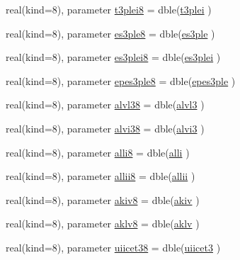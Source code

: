 \begin{DoxyCompactItemize}
\item 
real(kind=8), parameter \hyperlink{namespaceconsts__coms_a9a4f83fc2d002ec3752516d7626b28c7}{t3plei8} = dble(\hyperlink{namespaceconsts__coms_a091ec81cfeedd9148a6f44471936ab4f}{t3plei} )
\item 
real(kind=8), parameter \hyperlink{namespaceconsts__coms_a0296d1fa8ac9a5b8469ab8cc28dc0b1c}{es3ple8} = dble(\hyperlink{namespaceconsts__coms_acce85d2ba9f93e18b505d97bffd4a453}{es3ple} )
\item 
real(kind=8), parameter \hyperlink{namespaceconsts__coms_aca52530455d0c1b8063f2f30a3366291}{es3plei8} = dble(\hyperlink{namespaceconsts__coms_ae5b40232ff74fe2d9258b854fe070dc6}{es3plei} )
\item 
real(kind=8), parameter \hyperlink{namespaceconsts__coms_aab17990b5af5fd6746fc4465af9394ba}{epes3ple8} = dble(\hyperlink{namespaceconsts__coms_a12ac1017d17262aa7e40fa9a325273b9}{epes3ple} )
\item 
real(kind=8), parameter \hyperlink{namespaceconsts__coms_a975fb046d5ee7ab5b6b9cef9f840808d}{alvl38} = dble(\hyperlink{namespaceconsts__coms_a8458ca23e2c2f0ef6580474773afd4e8}{alvl3} )
\item 
real(kind=8), parameter \hyperlink{namespaceconsts__coms_a93d2577c7a09eea29f032257a759bef3}{alvi38} = dble(\hyperlink{namespaceconsts__coms_aa133e21cddffbe4c7673ae73771a15bb}{alvi3} )
\item 
real(kind=8), parameter \hyperlink{namespaceconsts__coms_acc1b8962e7dd43281926417aa95561f7}{alli8} = dble(\hyperlink{namespaceconsts__coms_aed7ce8242223a8b27f2052b3082e34d8}{alli} )
\item 
real(kind=8), parameter \hyperlink{namespaceconsts__coms_a0d860a9c3e3614a0129bb0eeb22387e6}{allii8} = dble(\hyperlink{namespaceconsts__coms_a4fd9b42d0269a2878dee9276cab091c5}{allii} )
\item 
real(kind=8), parameter \hyperlink{namespaceconsts__coms_a6a7209c2fd5f7e59d9dac0d61368fe74}{akiv8} = dble(\hyperlink{namespaceconsts__coms_a59810df1b5b54dbe510de801eb433951}{akiv} )
\item 
real(kind=8), parameter \hyperlink{namespaceconsts__coms_a03b5f451f4332f706d323b3de82210d9}{aklv8} = dble(\hyperlink{namespaceconsts__coms_a5f00cfbd5e6d86aeaafaddbda45f58d0}{aklv} )
\item 
real(kind=8), parameter \hyperlink{namespaceconsts__coms_a93bb3f6b23cdf15d90094bd2ba30ad8a}{uiicet38} = dble(\hyperlink{namespaceconsts__coms_a4acdb50399e47f446b674d2ba133e667}{uiicet3} )
\item 

\end{DoxyCompactItemize}
